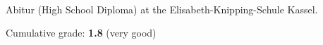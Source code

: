 \\
\begin{tightemize}
\item Abitur (High School Diploma) at the Elisabeth-Knipping-Schule Kassel. 

Cumulative grade: \textbf{1.8} (very good)
\end{tightemize}

